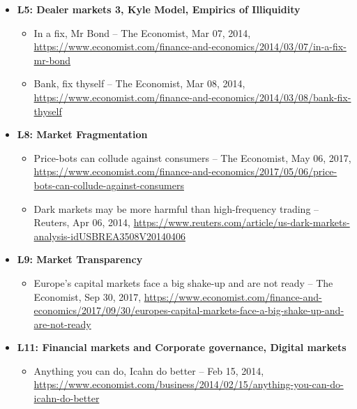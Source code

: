 \documentclass{article}
\begin{document}
\begin{itemize}
	\item \textbf{L5: Dealer markets 3, Kyle Model, Empirics of Illiquidity}
	\begin{itemize}
		\item \raggedright In a fix, Mr Bond -- The Economist, Mar 07, 2014, \url{https://www.economist.com/finance-and-economics/2014/03/07/in-a-fix-mr-bond}
		\item \raggedright Bank, fix thyself -- The Economist, Mar 08, 2014, \url{https://www.economist.com/finance-and-economics/2014/03/08/bank-fix-thyself}
	\end{itemize}
	
	\item \textbf{L8: Market Fragmentation}
	\begin{itemize}
		\item \raggedright Price-bots can collude against consumers -- The Economist, May 06, 2017, \url{https://www.economist.com/finance-and-economics/2017/05/06/price-bots-can-collude-against-consumers}
		\item \raggedright Dark markets may be more harmful than high-frequency trading -- Reuters, Apr 06, 2014, \url{https://www.reuters.com/article/us-dark-markets-analysis-idUSBREA3508V20140406}
	\end{itemize}
	
	\item \textbf{L9: Market Transparency}
	\begin{itemize}
		\item \raggedright Europe’s capital markets face a big shake-up and are not ready -- The Economist, Sep 30, 2017, \url{https://www.economist.com/finance-and-economics/2017/09/30/europes-capital-markets-face-a-big-shake-up-and-are-not-ready}
	\end{itemize}
	
	\item \textbf{L11: Financial markets and Corporate governance, Digital markets}
	\begin{itemize}
		\item \raggedright Anything you can do, Icahn do better -- Feb 15, 2014, \url{https://www.economist.com/business/2014/02/15/anything-you-can-do-icahn-do-better}
	\end{itemize}	
\end{itemize}


\end{document}
